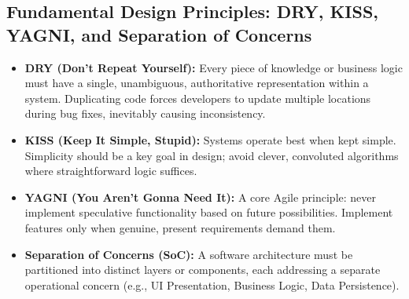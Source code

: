 \subsection{Fundamental Design Principles: DRY, KISS, YAGNI, and Separation of Concerns}
\begin{itemize}
    \item \textbf{DRY (Don't Repeat Yourself):} Every piece of knowledge or business logic must have a single, unambiguous, authoritative representation within a system. Duplicating code forces developers to update multiple locations during bug fixes, inevitably causing inconsistency.
    \item \textbf{KISS (Keep It Simple, Stupid):} Systems operate best when kept simple. Simplicity should be a key goal in design; avoid clever, convoluted algorithms where straightforward logic suffices.
    \item \textbf{YAGNI (You Aren't Gonna Need It):} A core Agile principle: never implement speculative functionality based on future possibilities. Implement features only when genuine, present requirements demand them.
    \item \textbf{Separation of Concerns (SoC):} A software architecture must be partitioned into distinct layers or components, each addressing a separate operational concern (e.g., UI Presentation, Business Logic, Data Persistence).
\end{itemize}

